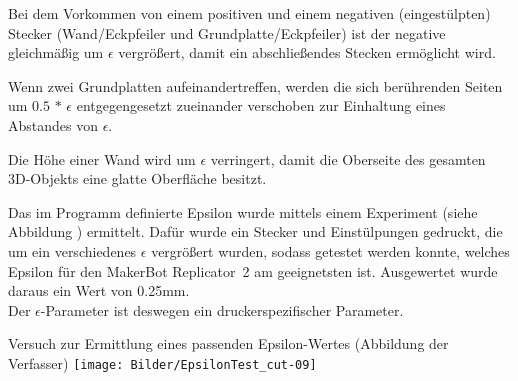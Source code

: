 \begin{compactenum}
	\item Bei dem Vorkommen von einem positiven und einem negativen (eingestülpten) Stecker (Wand/Eckpfeiler und Grundplatte/Eckpfeiler) ist der negative gleichmäßig um {\Large$\epsilon$} vergrößert, damit ein abschließendes Stecken ermöglicht wird.
	\item Wenn zwei Grundplatten aufeinandertreffen, werden die sich berührenden Seiten um $0.5$ $*$ {\Large$\epsilon$} entgegengesetzt zueinander verschoben zur Einhaltung eines Abstandes von {\Large$\epsilon$}.
	\item Die Höhe einer Wand wird um {\Large$\epsilon$} verringert, damit die Oberseite des gesamten 3D-Objekts eine glatte Oberfläche besitzt.
\end{compactenum}

Das im Programm definierte Epsilon wurde mittels einem Experiment (siehe Abbildung \thebildnrnext) ermittelt.
Dafür wurde ein Stecker und Einstülpungen gedruckt, die um ein verschiedenes {\Large$\epsilon$} vergrößert wurden, sodass getestet werden konnte, welches Epsilon für den MakerBot Replicator\texttrademark\ 2 am geeignetsten ist.
Ausgewertet wurde daraus ein Wert von 0.25mm. \\
Der {\Large$\epsilon$}-Parameter ist deswegen ein druckerspezifischer Parameter.

\begin{Bild}{Versuch zur Ermittlung eines passenden Epsilon-Wertes (Abbildung der Verfasser)}
		\texttt{[image: Bilder/EpsilonTest\_cut-09]}
\end{Bild}

